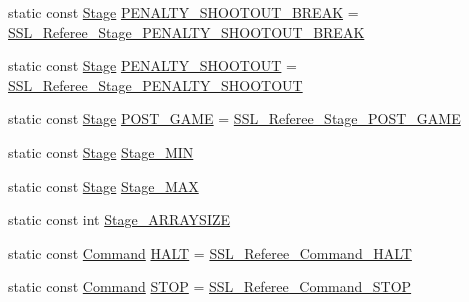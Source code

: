\begin{DoxyCompactItemize}
\item 
static const \hyperlink{referee_8pb_8h_a38b80041d0259d508796c1bc7ab57c4c}{Stage} \hyperlink{class_s_s_l___referee_af5fe25f55d083ef71e3425f7e0189bea}{P\-E\-N\-A\-L\-T\-Y\-\_\-\-S\-H\-O\-O\-T\-O\-U\-T\-\_\-\-B\-R\-E\-A\-K} = \hyperlink{referee_8pb_8h_a38b80041d0259d508796c1bc7ab57c4cadf813d03693e0c1fa58a296c1c5a4982}{S\-S\-L\-\_\-\-Referee\-\_\-\-Stage\-\_\-\-P\-E\-N\-A\-L\-T\-Y\-\_\-\-S\-H\-O\-O\-T\-O\-U\-T\-\_\-\-B\-R\-E\-A\-K}
\item 
static const \hyperlink{referee_8pb_8h_a38b80041d0259d508796c1bc7ab57c4c}{Stage} \hyperlink{class_s_s_l___referee_a9043e5f3c7b24e531d91bc1a4ba4ff9e}{P\-E\-N\-A\-L\-T\-Y\-\_\-\-S\-H\-O\-O\-T\-O\-U\-T} = \hyperlink{referee_8pb_8h_a38b80041d0259d508796c1bc7ab57c4ca24ca05bfc9a181e9dc0d1b807eff0cb8}{S\-S\-L\-\_\-\-Referee\-\_\-\-Stage\-\_\-\-P\-E\-N\-A\-L\-T\-Y\-\_\-\-S\-H\-O\-O\-T\-O\-U\-T}
\item 
static const \hyperlink{referee_8pb_8h_a38b80041d0259d508796c1bc7ab57c4c}{Stage} \hyperlink{class_s_s_l___referee_a03afd7622ce038a78a5e6e6086c6fee5}{P\-O\-S\-T\-\_\-\-G\-A\-M\-E} = \hyperlink{referee_8pb_8h_a38b80041d0259d508796c1bc7ab57c4ca431da1263444794295dc3f6584b55fb3}{S\-S\-L\-\_\-\-Referee\-\_\-\-Stage\-\_\-\-P\-O\-S\-T\-\_\-\-G\-A\-M\-E}
\item 
static const \hyperlink{referee_8pb_8h_a38b80041d0259d508796c1bc7ab57c4c}{Stage} \hyperlink{class_s_s_l___referee_a846b2fccc0f85f19185e811d3552280c}{Stage\-\_\-\-M\-I\-N}
\item 
static const \hyperlink{referee_8pb_8h_a38b80041d0259d508796c1bc7ab57c4c}{Stage} \hyperlink{class_s_s_l___referee_a0c1e6582db22f5c6dcc4c86f849ece47}{Stage\-\_\-\-M\-A\-X}
\item 
static const int \hyperlink{class_s_s_l___referee_a0a59fcfe43e53c336d86ab37e4edebec}{Stage\-\_\-\-A\-R\-R\-A\-Y\-S\-I\-Z\-E}
\item 
static const \hyperlink{referee_8pb_8h_a25bd5aba081a4c85e54d6ed275358d79}{Command} \hyperlink{class_s_s_l___referee_ab8715acde531d57fa49c895da6db99e4}{H\-A\-L\-T} = \hyperlink{referee_8pb_8h_a25bd5aba081a4c85e54d6ed275358d79abbb307eace3fd666d75b912c2b33b888}{S\-S\-L\-\_\-\-Referee\-\_\-\-Command\-\_\-\-H\-A\-L\-T}
\item 
static const \hyperlink{referee_8pb_8h_a25bd5aba081a4c85e54d6ed275358d79}{Command} \hyperlink{class_s_s_l___referee_abf541b386a39f54b87622cd8ebafd77f}{S\-T\-O\-P} = \hyperlink{referee_8pb_8h_a25bd5aba081a4c85e54d6ed275358d79a5ff641a64f39a6a370b12a4473440c51}{S\-S\-L\-\_\-\-Referee\-\_\-\-Command\-\_\-\-S\-T\-O\-P}

\end{DoxyCompactItemize}
